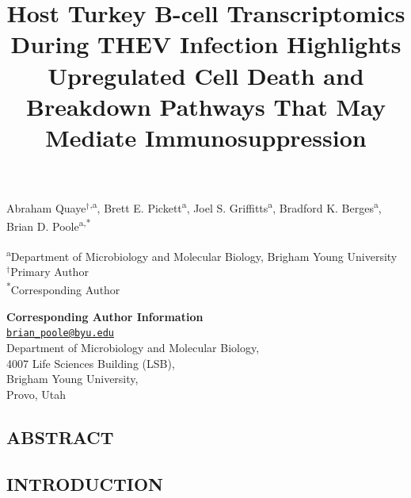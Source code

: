 \documentclass[
]{article}
\title{Host Turkey B-cell Transcriptomics During THEV Infection
Highlights Upregulated Cell Death and Breakdown Pathways That May
Mediate Immunosuppression}
\author{}
\date{\vspace{-2.5em}}
\begin{document}
\maketitle

\vspace{5mm}

Abraham Quaye\({^\dagger}\)\textsuperscript{,a}, Brett E.
Pickett\textsuperscript{a}, Joel S. Griffitts\textsuperscript{a},
Bradford K. Berges\textsuperscript{a}, Brian D.
Poole\textsuperscript{a,*}

\vspace{5mm}

\textsuperscript{a}Department of Microbiology and Molecular Biology,
Brigham Young University\\
\({^\dagger}\)Primary Author\\
\textsuperscript{*}Corresponding Author

\vspace{5mm}

\textbf{Corresponding Author Information}\\
\href{mailto:brian_poole@byu.edu}{\nolinkurl{brian\_poole@byu.edu}}\\
Department of Microbiology and Molecular Biology,\\
4007 Life Sciences Building (LSB),\\
Brigham Young University,\\
Provo, Utah\\

\newpage

\subsection{ABSTRACT}\label{abstract}

\newpage

\subsection{INTRODUCTION}\label{introduction}
\end{document}
